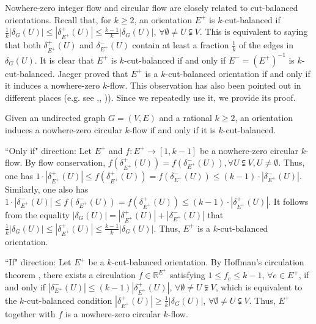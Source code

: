 \documentclass[runningheads]{llncs}
\let\proof\relax\let\endproof\relax
\newcommand{\R}{\mathbb{R}}
\begin{document}
Nowhere-zero integer flow and circular flow are closely related to cut-balanced orientations. Recall that, for $k \geq 2$, an orientation $E^+$ is $k$-cut-balanced if $\frac{1}{k}|\delta_{G}(U)|\leq |\delta^+_{E^+}(U)|\leq \frac{k-1}{k}|\delta_{G}(U)|$, $\forall \emptyset \neq U\subsetneqq V$. This is equivalent to saying that both $\delta_{E^+}^+(U)$ and $\delta_{E^+}^-(U)$ 
contain at least a fraction $\frac{1}{k}$ of the edges 
in $\delta_{G}(U)$. It is clear that $E^+$ is $k$-cut-balanced if and only if $E^-=(E^+)^{-1}$ is $k$-cut-balanced. Jaeger \cite{jaeger1976balanced} proved that $E^+$ is a $k$-cut-balanced orientation if and only if it induces a nowhere-zero $k$-flow. This observation has also been pointed out in different places (e.g. see \cite{goddyn2001open},\cite{goddyn1998k}, \cite{thomassen2012weak})). Since we repeatedly use it, we provide its proof.





\begin{lemma}\label{lem:key}
    Given an undirected graph $G = (V,E)$ and a rational $k\geq 2$, an orientation induces a nowhere-zero circular $k$-flow if and only if it is $k$-cut-balanced.
\end{lemma}

\proof
    ``Only if" direction: Let $E^+$ and $f:E^+\rightarrow [1,k-1]$ be a nowhere-zero circular $k$-flow. By flow conservation, $f(\delta^+_{E^+}(U))=f(\delta^-_{E^+}(U)),\forall U \subsetneqq V, U\neq\emptyset$. Thus, one has $1\cdot |\delta^+_{E^+}(U)|\leq f(\delta^+_{E^+}(U))=f(\delta^-_{E^+}(U))\leq (k-1)\cdot |\delta^-_{E^+}(U)|$. Similarly, one also has $1\cdot |\delta^-_{E^+}(U)|\leq f(\delta^-_{E^+}(U))=f(\delta^+_{E^+}(U))\leq (k-1)\cdot |\delta^+_{E^+}(U)|$. It follows from the equality $|\delta_G(U)|=|\delta_{E^+}^+(U)|+|\delta_{E^+}^-(U)|$ that $\frac{1}{k}|\delta_{G}(U)|\leq |\delta^+_{E^+}(U)|\leq \frac{k-1}{k}|\delta_{G}(U)|$. Thus, $E^+$ is a $k$-cut-balanced orientation.

    ``If" direction: Let $E^+$ be a $k$-cut-balanced orientation. By Hoffman's circulation theorem \cite{hoffman2003some}, there exists a circulation $f\in\R^{E^+}$ satisfying $1\leq f_e\leq k-1$, $\forall e\in E^+$, if and only if $|\delta_{E^+}^-(U)|\leq (k-1)|\delta_{E^+}^+(U)|$, $\forall \emptyset \neq U\subsetneqq V$, which is equivalent to the $k$-cut-balanced condition $|\delta_{E^+}^+(U)|\geq \frac{1}{k}|\delta_{G}(U)|$, $\forall \emptyset \neq U\subsetneqq V$. Thus, $E^+$ together with $f$ is a nowhere-zero circular $k$-flow.
\qedsymbol
\end{document}

